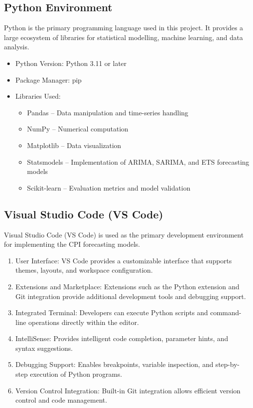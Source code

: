 \subsection{Python Environment}

Python is the primary programming language used in this project. It provides a large ecosystem of libraries for statistical modelling, machine learning, and data analysis.

\begin{itemize}
	\item Python Version: Python 3.11 or later
	\item Package Manager: pip
	\item Libraries Used:
	\begin{itemize}
		\item Pandas – Data manipulation and time-series handling
		\item NumPy – Numerical computation
		\item Matplotlib – Data visualization
		\item Statsmodels – Implementation of ARIMA, SARIMA, and ETS forecasting models
		\item Scikit-learn – Evaluation metrics and model validation
	\end{itemize}
\end{itemize}

\subsection{Visual Studio Code (VS Code)}

Visual Studio Code (VS Code) is used as the primary development environment for implementing the CPI forecasting models.

\begin{enumerate}
	
	\item User Interface: VS Code provides a customizable interface that supports themes, layouts, and workspace configuration.
	
	\item Extensions and Marketplace: Extensions such as the Python extension and Git integration provide additional development tools and debugging support.
	
	\item Integrated Terminal: Developers can execute Python scripts and command-line operations directly within the editor.
	
	\item IntelliSense: Provides intelligent code completion, parameter hints, and syntax suggestions.
	
	\item Debugging Support: Enables breakpoints, variable inspection, and step-by-step execution of Python programs.
	
	\item Version Control Integration: Built-in Git integration allows efficient version control and code management.
	
\end{enumerate}


